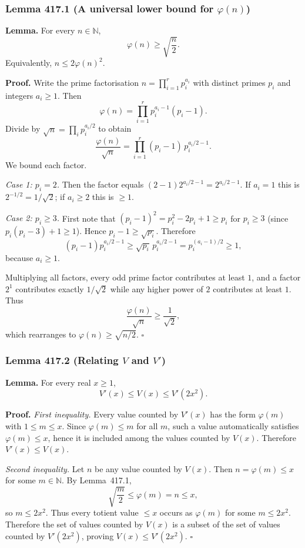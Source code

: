 \subsubsection*{Lemma 417.1 (A universal lower bound for $\varphi(n)$)}
\textbf{Lemma.} For every $n\in\mathbb{N}$,
\[
\varphi(n)\ge \sqrt{\frac{n}{2}}.
\]
Equivalently, $n\le 2\varphi(n)^2$.

\textbf{Proof.}
Write the prime factorisation $n=\prod_{i=1}^r p_i^{a_i}$ with distinct primes $p_i$ and integers $a_i\ge 1$.
Then
\[
\varphi(n)=\prod_{i=1}^r p_i^{a_i-1}(p_i-1).
\]
Divide by $\sqrt{n}=\prod_i p_i^{a_i/2}$ to obtain
\[
\frac{\varphi(n)}{\sqrt{n}} = \prod_{i=1}^r (p_i-1)\,p_i^{a_i/2-1}.
\]
We bound each factor.

\emph{Case 1: $p_i=2$.}
Then the factor equals $(2-1)2^{a_i/2-1}=2^{a_i/2-1}$.
If $a_i=1$ this is $2^{-1/2}=1/\sqrt{2}$; if $a_i\ge 2$ this is $\ge 1$.

\emph{Case 2: $p_i\ge 3$.}
First note that $(p_i-1)^2=p_i^2-2p_i+1\ge p_i$ for $p_i\ge 3$ (since $p_i(p_i-3)+1\ge 1$).
Hence $p_i-1\ge \sqrt{p_i}$.
Therefore
\[
(p_i-1)p_i^{a_i/2-1} \ge \sqrt{p_i}\,p_i^{a_i/2-1}=p_i^{(a_i-1)/2}\ge 1,
\]
because $a_i\ge 1$.

Multiplying all factors, every odd prime factor contributes at least $1$, and a factor $2^1$ contributes exactly $1/\sqrt{2}$ while any higher power of $2$ contributes at least $1$.
Thus
\[
\frac{\varphi(n)}{\sqrt{n}} \ge \frac{1}{\sqrt{2}},
\]
which rearranges to $\varphi(n)\ge \sqrt{n/2}$.
\hfill$\square$

\subsubsection*{Lemma 417.2 (Relating $V$ and $V'$)}
\textbf{Lemma.} For every real $x\ge 1$,
\[
V'(x)\le V(x)\le V'(2x^2).
\]

\textbf{Proof.}
\emph{First inequality.}
Every value counted by $V'(x)$ has the form $\varphi(m)$ with $1\le m\le x$.
Since $\varphi(m)\le m$ for all $m$, such a value automatically satisfies $\varphi(m)\le x$, hence it is included among the values counted by $V(x)$. Therefore $V'(x)\le V(x)$.

\emph{Second inequality.}
Let $n$ be any value counted by $V(x)$. Then $n=\varphi(m)\le x$ for some $m\in\mathbb{N}$.
By Lemma~417.1,
\[
\sqrt{\frac{m}{2}}\le \varphi(m)=n\le x,
\]
so $m\le 2x^2$.
Thus every totient value $\le x$ occurs as $\varphi(m)$ for some $m\le 2x^2$.
Therefore the set of values counted by $V(x)$ is a subset of the set of values counted by $V'(2x^2)$, proving $V(x)\le V'(2x^2)$.
\hfill$\square$


